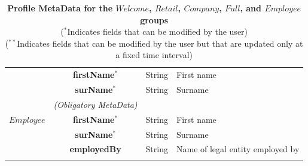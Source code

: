 \begin{table}[H]
\begin{centering}
{\begin{tabular}{ r | c | l | l }
\cline{2-2}
			& {\bf firstName}$^*$			&String	& First name \\
			& {\bf surName}$^*$			&String	& Surname \\
\Xhline{1.5pt}
			& \emph{(Obligatory MetaData)} & & \\
\cline{2-2}
$Employee$	& {\bf firstName}$^*$			&String	& First name \\
			& {\bf surName}$^*$			&String	& Surname \\
			& {\bf employedBy}			&String	& Name of legal entity employed by \\
\Xhline{1.5pt}
\end{tabular}
}
\caption{\small\textbf{Profile MetaData for the $Welcome$, $Retail$, $Company$, $Full$, and $Employee$ groups}\\
($^*$Indicates fields that can be modified by the user)\\
($^{**}$Indicates fields that can be modified by the user but that are updated only at a fixed time interval)}
\label{tab:ProfileMetaData1}
\end{centering}
\end{table}



